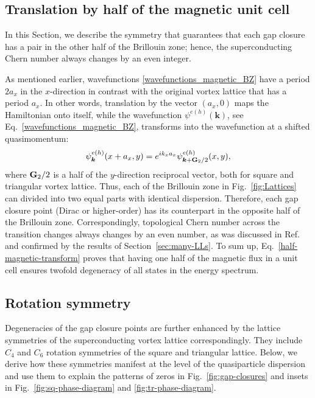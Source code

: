 \documentclass[10pt,prb,aps,superscriptaddress,amsmath,amssymb,twocolumn,floatfix,longbibliography]{revtex4-1}
\newcommand{\be}{\begin{equation} }
\newcommand{\ee}{\end{equation}}
\newcommand{\bG}{{\bf G}}
\begin{document}
\subsection{Translation by half of the magnetic unit cell}
\label{sec:half-magnetic-translation}

In this Section, we describe the symmetry that guarantees that each gap closure has a pair in the other half of the Brillouin zone; hence, the superconducting Chern number always changes by an even integer. 

As mentioned earlier, wavefunctions \eqref{wavefunctions_magnetic_BZ} have a period $2a_x$ in the $x$-direction in contrast with the original vortex lattice that has a period $a_x$. In other words, translation by the vector $(a_x, 0)$ maps the Hamiltonian onto itself, while the wavefunction $\psi^{e(h)}(\bm{k})$, see Eq.~\eqref{wavefunctions_magnetic_BZ}, transforms into the wavefunction at a shifted quasimomentum:
\be \label{half-magnetic-transform}
    \psi^{e(h)}_{\bm{k}}(x + a_x, y) = e^{i k_x a_x} \psi^{e(h)}_{\bm{k} + \bG_2 / 2} (x,y),
\ee
where $\bG_2 / 2$ is a half of the $y$-direction reciprocal vector, both for square and triangular vortex lattice. Thus, each of the Brillouin zone in Fig.~\ref{fig:Lattices} can divided into two equal parts with identical dispersion. Therefore, each gap closure point (Dirac or higher-order) has its counterpart in the opposite half of the Brillouin zone. Correspondingly, topological Chern number across the transition changes always changes by an even number, as was discussed in Ref.~ and confirmed by the results of Section~\ref{sec:many-LLs}.
To sum up, Eq.~\eqref{half-magnetic-transform} proves that having one half of the magnetic flux in a unit cell ensures twofold degeneracy of all states in the energy spectrum.


\subsection{Rotation symmetry}
Degeneracies of the gap closure points are further enhanced by the lattice symmetries of the superconducting vortex lattice correspondingly. They include $C_4$ and $C_6$ rotation symmetries of the square and triangular lattice. Below, we derive how these symmetries manifest at the level of the quasiparticle dispersion and use them to explain the patterns of zeros in Fig.~\ref{fig:gap-closures} and insets in Fig.~\ref{fig:sq-phase-diagram} and \ref{fig:tr-phase-diagram}. 
\end{document}
